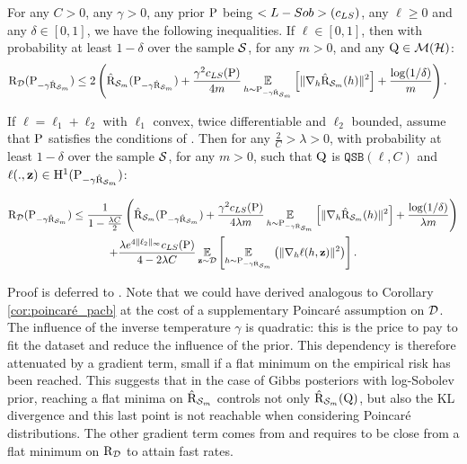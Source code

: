 \begin{theorem}\label{th: gibbs_pacb}
For any $C>0$, any $\gamma>0$, any prior $\P$ being $\Lsob(c_{LS})$, any $\ell\geq 0$ and any $\delta\in [0,1]$, we have the following inequalities.
If $\ell\in [0,1]$, then with probability at least $1-\delta$ over the sample $\S$, for any $m>0$, and any $\Q\in\Mcal(\Hcal)$:
\begin{align*}
    \Risk_{\D}(\P_{-\gamma \hat{\Risk}_{\S_m}}) & \leq 2 \LP \hat{\Risk}_{\S_m}(\P_{-\gamma \hat{\Risk}_{\S_m}}) + \frac{\gamma^2 c_{LS}(\P)}{4m} \EE_{h\sim \P_{-\gamma \hat{\Risk}_{\S_m}}}\LB \|\nabla_h \hat{\Risk}_{\S_m}(h) \|^2 \RB + \frac{\log(1/\delta)}{m} \RP .
\end{align*}

If $\ell= \ell_1+\ell_2$ with $\ell_1$ convex, twice differentiable and $\ell_2$ bounded, assume that $\P$ satisfies the conditions of . Then for any $\frac{2}{C}> \lambda>0$, with probability at least $1-\delta$ over the sample $\S$, for any $m>0$, such that $\Q$ is $\texttt{QSB}(\ell,C)$ and $\ell(.,\z)\in \mathrm{H}^{1}(\P_{-\gamma \hat{\Risk}_{\S_m}})$:

\begin{multline*}
    \Risk_{\D}(\P_{-\gamma \hat{\Risk}_{\S_m}})  \leq \frac{1}{1-\frac{\lambda C}{2}} \LP \hat{\Risk}_{\S_m}(\P_{-\gamma \hat{\Risk}_{\S_m}}) + \frac{\gamma^2 c_{LS}(\P)}{4\lambda m} \EE_{h\sim \P_{-\gamma \hat{\Risk}_{\S_m}}}\LB \|\nabla_h \hat{\Risk}_{\S_m}(h) \|^2 \RB + \frac{\log(1/\delta)}{\lambda m} \RP \\ 
    + \frac{\lambda e^{4\|\ell_2\|_{\infty}}c_{LS}(\P) }{4-2\lambda C} \EE_{\z\sim\D} \LB \EE_{h\sim \P_{-\gamma \hat{\Risk}_{\S_m}}}\LP \|\nabla_h \ell(h,\z)\|^2 \RP \RB .
\end{multline*} 
\end{theorem}
Proof is deferred to .
Note that we could have derived analogous to Corollary \ref{cor:poincaré_pacb} at the cost of a supplementary Poincaré assumption on $\D$.
The influence of the inverse temperature $\gamma$ is quadratic: this is the price to pay to fit the dataset and reduce the influence of the prior.
This dependency is therefore attenuated by a gradient term, small if a flat minimum on the empirical risk has been reached.
This suggests that in the case of Gibbs posteriors with log-Sobolev prior, reaching a flat minima on $\hat{\Risk}_{\S_m}$ controls not only $\hat{\Risk}_{\S_m}(\Q)$, but also the KL divergence and this last point is not reachable when considering Poincaré distributions.
The other gradient term comes from  and requires to be close from a flat minimum on $\Risk_\D$ to attain fast rates. 

